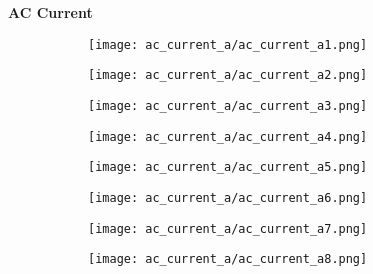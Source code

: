 \documentclass{article}
\begin{document}
    \textbf{AC Current}
    \begin{figure}[H]
        \centering
        \begin{subfigure}{0.48\linewidth}
		    \texttt{[image: ac\_current\_a/ac\_current\_a1.png]}
	    \end{subfigure}
	    \begin{subfigure}{0.48\linewidth}
		    \texttt{[image: ac\_current\_a/ac\_current\_a2.png]}
	    \end{subfigure}
	    \begin{subfigure}{0.48\linewidth}
		    \texttt{[image: ac\_current\_a/ac\_current\_a3.png]}
	    \end{subfigure}
	    \begin{subfigure}{0.48\linewidth}
		    \texttt{[image: ac\_current\_a/ac\_current\_a4.png]}
	    \end{subfigure}
	    \begin{subfigure}{0.48\linewidth}
		    \texttt{[image: ac\_current\_a/ac\_current\_a5.png]}
	    \end{subfigure}
	    \begin{subfigure}{0.48\linewidth}
		    \texttt{[image: ac\_current\_a/ac\_current\_a6.png]}
	    \end{subfigure}
	    \begin{subfigure}{0.48\linewidth}
		    \texttt{[image: ac\_current\_a/ac\_current\_a7.png]}
	    \end{subfigure}
	    \begin{subfigure}{0.48\linewidth}
		    \texttt{[image: ac\_current\_a/ac\_current\_a8.png]}
	    \end{subfigure}
    \end{figure}
    
    \pagebreak
    
\end{document}
